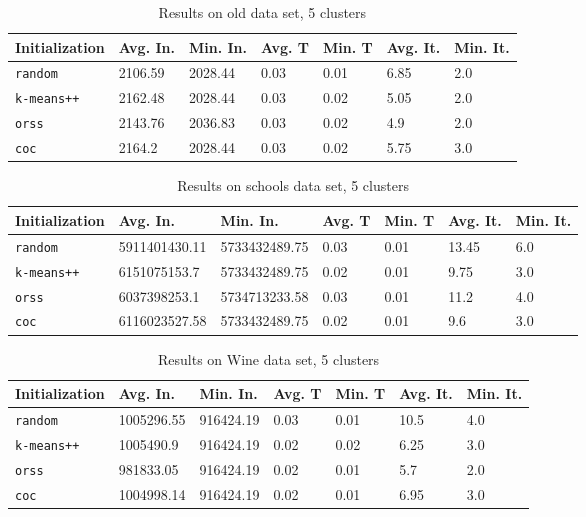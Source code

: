 \begin{table}[p]
	\begin{center}
		\begin{tabular}{|l|l|l|l|l|l|l|}
			\hline
			Initialization & Avg. In. & Min. In. & Avg. T & Min. T & Avg. It. & Min. It.\\\hline
			\texttt{random} & 2106.59 & 2028.44 & 0.03 & 0.01 & 6.85 & 2.0\\\hline
			\texttt{k-means++} & 2162.48 & 2028.44 & 0.03 & 0.02 & 5.05 & 2.0\\\hline
			\texttt{orss} & 2143.76 & 2036.83 & 0.03 & 0.02 & 4.9 & 2.0\\\hline
			\texttt{coc} & 2164.2 & 2028.44 & 0.03 & 0.02 & 5.75 & 3.0\\\hline
		\end{tabular}
		\caption{Results on old data set, 5 clusters}
		\label{tbl:old5}
	\end{center}
\end{table}

\begin{table}[p]
	\begin{center}
		\begin{tabular}{|l|l|l|l|l|l|l|}
			\hline
			Initialization & Avg. In. & Min. In. & Avg. T & Min. T & Avg. It. & Min. It.\\\hline
			\texttt{random} & 5911401430.11 & 5733432489.75 & 0.03 & 0.01 & 13.45 & 6.0\\\hline
			\texttt{k-means++} & 6151075153.7 & 5733432489.75 & 0.02 & 0.01 & 9.75 & 3.0\\\hline
			\texttt{orss} & 6037398253.1 & 5734713233.58 & 0.03 & 0.01 & 11.2 & 4.0\\\hline
			\texttt{coc} & 6116023527.58 & 5733432489.75 & 0.02 & 0.01 & 9.6 & 3.0\\\hline
		\end{tabular}
		\caption{Results on schools data set, 5 clusters}
		\label{tbl:schools5}
	\end{center}
\end{table}

\begin{table}[p]
	\begin{center}
		\begin{tabular}{|l|l|l|l|l|l|l|}
			\hline
			Initialization & Avg. In. & Min. In. & Avg. T & Min. T & Avg. It. & Min. It.\\\hline
			\texttt{random} & 1005296.55 & 916424.19 & 0.03 & 0.01 & 10.5 & 4.0\\\hline
			\texttt{k-means++} & 1005490.9 & 916424.19 & 0.02 & 0.02 & 6.25 & 3.0\\\hline
			\texttt{orss} & 981833.05 & 916424.19 & 0.02 & 0.01 & 5.7 & 2.0\\\hline
			\texttt{coc} & 1004998.14 & 916424.19 & 0.02 & 0.01 & 6.95 & 3.0\\\hline
		\end{tabular}
		\caption{Results on Wine data set, 5 clusters}
		\label{tbl:Wine5}
	\end{center}
\end{table}

